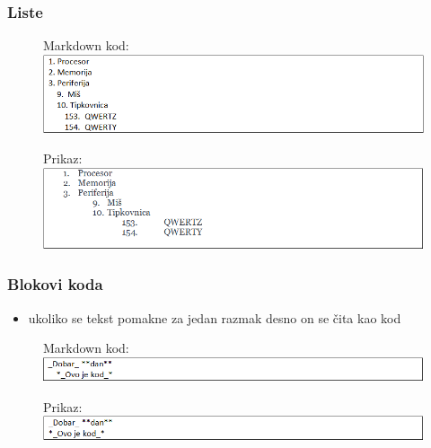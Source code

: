 \documentclass{beamer}
\begin{document}
\newpage
\begin{frame}
\frametitle{Liste}
\begin{figure}
{Markdown kod:}
\includegraphics[width = 1.0\linewidth]{Numerirane_liste.png}
\end{figure}

\begin{figure}
{Prikaz:}
\includegraphics[width = 1.0\linewidth]{Numerirane_liste_prikaz.png}
\end{figure}
\end{frame}

\newpage
\begin{frame}
\frametitle{Blokovi koda}
\begin{itemize}
\item ukoliko se tekst pomakne za jedan razmak desno on se čita kao kod
\end{itemize}

\begin{figure}
{Markdown kod:}
\includegraphics[width = 1.0\linewidth]{Blokovi_koda.png}
\end{figure}

\begin{figure}
{Prikaz:}
\includegraphics[width = 1.0\linewidth]{Blokovi_koda_prikaz.png}
\end{figure}


\end{frame}
\end{document}
